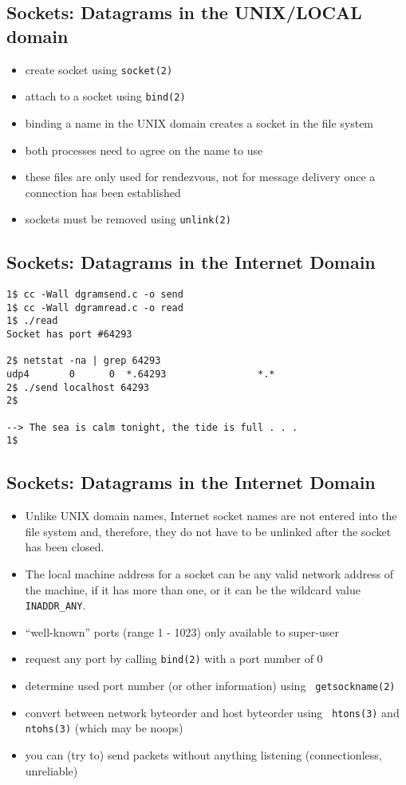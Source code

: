 \documentclass[xga]{xdvislides}
\begin{document}
\subsection{Sockets: Datagrams in the UNIX/LOCAL domain}
\begin{itemize}
	\item create socket using {\tt socket(2)}
	\item attach to a socket using {\tt bind(2)}
	\item binding a name in the UNIX domain creates a socket in the file system
	\item both processes need to agree on the name to use
	\item these files are only used for rendezvous, not for message delivery
		once a connection has been established
	\item sockets must be removed using {\tt unlink(2)}
\end{itemize}

\subsection{Sockets: Datagrams in the Internet Domain}
\begin{verbatim}
1$ cc -Wall dgramsend.c -o send
1$ cc -Wall dgramread.c -o read
1$ ./read
Socket has port #64293

2$ netstat -na | grep 64293
udp4       0      0  *.64293                *.*
2$ ./send localhost 64293
2$

--> The sea is calm tonight, the tide is full . . .
1$
\end{verbatim}
\vfill

\subsection{Sockets: Datagrams in the Internet Domain}
\begin{itemize}
	\item Unlike UNIX domain names, Internet socket names are not entered into
		the file system and, therefore, they do not have to be unlinked after the
		socket has been closed.
	\item The local machine address for a socket can be any valid network address
		of the machine, if it has more than one, or it can be the wildcard value
		{\tt INADDR\_ANY}.
	\item ``well-known'' ports (range 1 - 1023) only available to super-user
	\item request any port by calling {\tt bind(2)} with a port number of 0
	\item determine used port number (or other information) using {\tt
		getsockname(2)}
	\item convert between network byteorder and host byteorder using {\tt
		htons(3)} and {\tt ntohs(3)} (which may be noops)
	\item you can (try to) send packets without anything listening (connectionless, unreliable)
\end{itemize}
\end{document}

